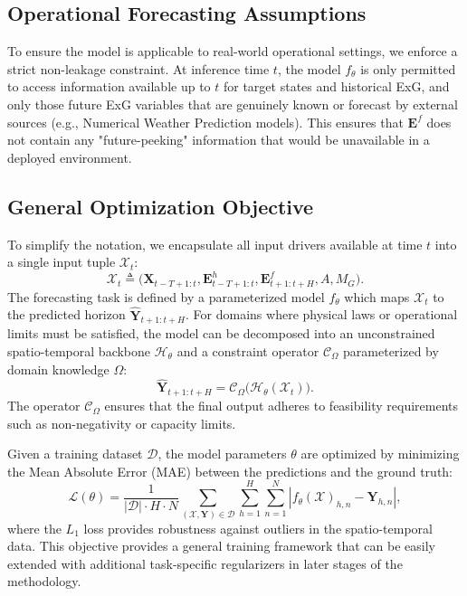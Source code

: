 \subsection{Operational Forecasting Assumptions}
To ensure the model is applicable to real-world operational settings, we enforce a strict non-leakage constraint. At inference time $t$, the model $f_{\theta}$ is only permitted to access information available up to $t$ for target states and historical ExG, and only those future ExG variables that are genuinely known or forecast by external sources (e.g., Numerical Weather Prediction models). This ensures that $\mathbf{E}^{f}$ does not contain any "future-peeking" information that would be unavailable in a deployed environment.

\subsection{General Optimization Objective}
To simplify the notation, we encapsulate all input drivers available at time $t$ into a single input tuple $\mathcal{X}_t$:
\begin{equation}
\mathcal{X}_t \triangleq \big(\mathbf{X}_{t-T+1:t}, \mathbf{E}^{h}_{t-T+1:t}, \mathbf{E}^{f}_{t+1:t+H}, A, M_G\big).
\label{eq:input_tuple}
\end{equation}
The forecasting task is defined by a parameterized model $f_{\theta}$ which maps $\mathcal{X}_t$ to the predicted horizon $\hat{\mathbf{Y}}_{t+1:t+H}$. For domains where physical laws or operational limits must be satisfied, the model can be decomposed into an unconstrained spatio-temporal backbone $\mathcal{H}_{\theta}$ and a constraint operator $\mathcal{C}_{\Omega}$ parameterized by domain knowledge $\Omega$:
\begin{equation}
\hat{\mathbf{Y}}_{t+1:t+H} = \mathcal{C}_{\Omega}\big(\mathcal{H}_{\theta}(\mathcal{X}_t)\big).
\label{eq:constrained_forecast}
\end{equation}
The operator $\mathcal{C}_{\Omega}$ ensures that the final output adheres to feasibility requirements such as non-negativity or capacity limits.

Given a training dataset $\mathcal{D}$, the model parameters $\theta$ are optimized by minimizing the Mean Absolute Error (MAE) between the predictions and the ground truth:
\begin{equation}
\mathcal{L}(\theta) = \frac{1}{|\mathcal{D}| \cdot H \cdot N} \sum_{(\mathcal{X}, \mathbf{Y}) \in \mathcal{D}} \sum_{h=1}^{H} \sum_{n=1}^{N} | f_{\theta}(\mathcal{X})_{h,n} - \mathbf{Y}_{h,n} |,
\label{eq:optimization_objective}
\end{equation}
where the $L_1$ loss provides robustness against outliers in the spatio-temporal data. This objective provides a general training framework that can be easily extended with additional task-specific regularizers in later stages of the methodology.
